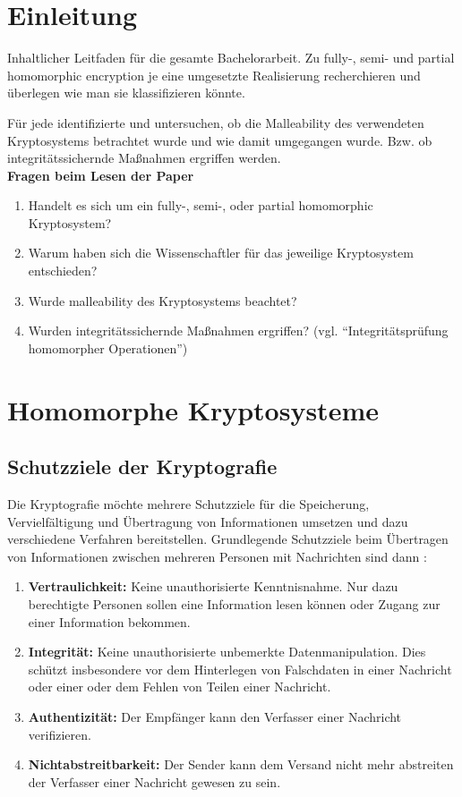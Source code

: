 \documentclass[12pt,a4paper]{scrartcl}	%
\begin{document}
\setcounter{page}{1}				%
\section{Einleitung}	
Inhaltlicher Leitfaden für die gesamte Bachelorarbeit. Zu fully-, semi- und partial homomorphic encryption je eine umgesetzte Realisierung recherchieren und überlegen wie man sie klassifizieren könnte.

Für jede identifizierte und untersuchen, ob die Malleability des verwendeten Kryptosystems betrachtet wurde und wie damit umgegangen wurde. Bzw. ob integritätssichernde Maßnahmen ergriffen werden.	
\\

\textbf{Fragen beim Lesen der Paper}
\begin{enumerate}
	\item Handelt es sich um ein fully-, semi-, oder partial homomorphic Kryptosystem?
	\item Warum haben sich die Wissenschaftler für das jeweilige Kryptosystem entschieden?
	\item Wurde malleability des Kryptosystems beachtet?
	\item Wurden integritätssichernde Maßnahmen ergriffen? (vgl. \enquote{Integritätsprüfung homomorpher Operationen})
\end{enumerate}
\newpage

\section{Homomorphe Kryptosysteme}

\subsection{Schutzziele der Kryptografie}
Die Kryptografie möchte mehrere Schutzziele für die Speicherung, Vervielfältigung und Übertragung von Informationen umsetzen und dazu verschiedene Verfahren bereitstellen. Grundlegende Schutzziele beim Übertragen von Informationen zwischen mehreren Personen mit Nachrichten sind dann \cite{mm2015itsec}\cite[p.2]{delfs2002introduction}:
\begin{enumerate}
	\item \textbf{Vertraulichkeit:} Keine unauthorisierte Kenntnisnahme. Nur dazu berechtigte Personen sollen eine Information lesen können oder Zugang zur einer Information bekommen.
	\item \textbf{Integrität:} Keine unauthorisierte unbemerkte  Datenmanipulation. Dies schützt insbesondere vor dem Hinterlegen von Falschdaten in einer Nachricht oder einer oder dem Fehlen von Teilen einer Nachricht.
	\item \textbf{Authentizität:} Der Empfänger kann den Verfasser einer Nachricht verifizieren. 
	\item \textbf{Nichtabstreitbarkeit:} Der Sender kann dem Versand nicht mehr abstreiten der Verfasser einer Nachricht gewesen zu sein.
\end{enumerate}
\end{document}
